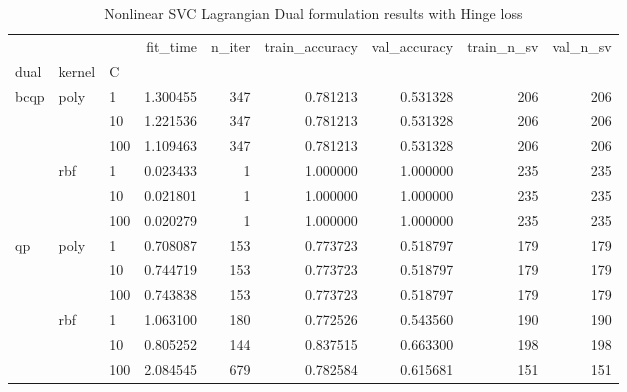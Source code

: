 \begin{table}[h!]
\centering
\caption{Nonlinear SVC Lagrangian Dual formulation results with Hinge loss}
\label{nonlinear_lagrangian_dual_svc_cv_results}
\begin{tabular}{lllrrrrrr}
\toprule
   &     &     &  fit\_time &  n\_iter &  train\_accuracy &  val\_accuracy &  train\_n\_sv &  val\_n\_sv \\
dual & kernel & C &           &         &                 &               &             &           \\
\midrule
bcqp & poly & 1   &  1.300455 &     347 &        0.781213 &      0.531328 &         206 &       206 \\
   &     & 10  &  1.221536 &     347 &        0.781213 &      0.531328 &         206 &       206 \\
   &     & 100 &  1.109463 &     347 &        0.781213 &      0.531328 &         206 &       206 \\
   & rbf & 1   &  0.023433 &       1 &        1.000000 &      1.000000 &         235 &       235 \\
   &     & 10  &  0.021801 &       1 &        1.000000 &      1.000000 &         235 &       235 \\
   &     & 100 &  0.020279 &       1 &        1.000000 &      1.000000 &         235 &       235 \\
qp & poly & 1   &  0.708087 &     153 &        0.773723 &      0.518797 &         179 &       179 \\
   &     & 10  &  0.744719 &     153 &        0.773723 &      0.518797 &         179 &       179 \\
   &     & 100 &  0.743838 &     153 &        0.773723 &      0.518797 &         179 &       179 \\
   & rbf & 1   &  1.063100 &     180 &        0.772526 &      0.543560 &         190 &       190 \\
   &     & 10  &  0.805252 &     144 &        0.837515 &      0.663300 &         198 &       198 \\
   &     & 100 &  2.084545 &     679 &        0.782584 &      0.615681 &         151 &       151 \\
\bottomrule
\end{tabular}
\end{table}
